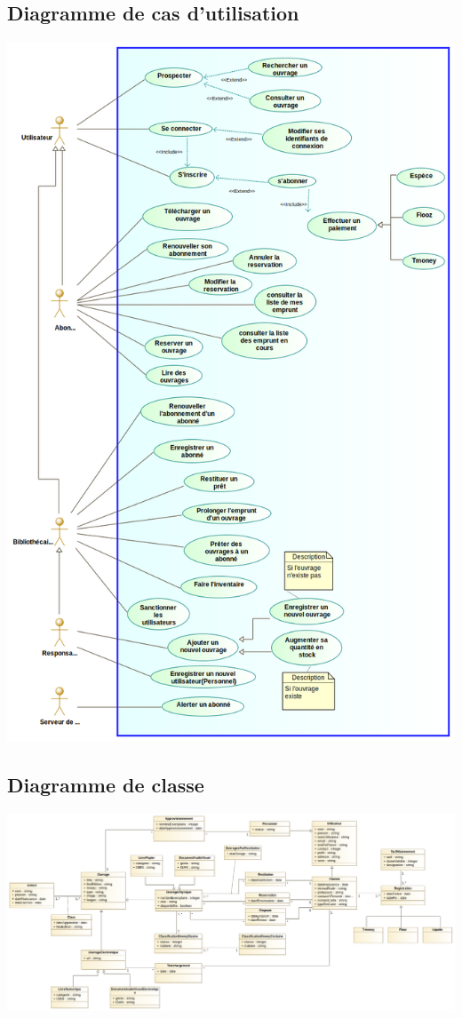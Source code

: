 \documentclass[12pt,a4paper]{article}
\begin{document}
\subsection{Diagramme de cas d'utilisation}
\includegraphics[scale=0.5]{../../design/UseCase.png}
\subsection{Diagramme de classe}
\includegraphics[scale=0.3]{../../design/ClassD.png}
\end{document}
